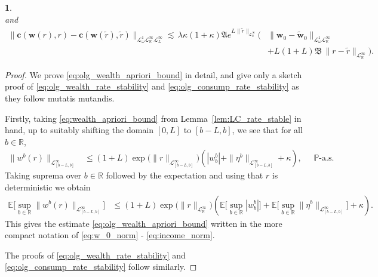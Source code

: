 \documentclass[11pt,oneside,english,reqno,dvipsnames,table]{amsart}
\numberwithin{equation}{section}
\theoremstyle{plain}
\theoremstyle{definition}
\theoremstyle{remark}
\theoremstyle{plain}
\newtheorem{lem}[thm]{\protect\lemmaname}
\theoremstyle{plain}
\theoremstyle{plain}
\theoremstyle{plain}
\theoremstyle{plain}
\theoremstyle{plain}
\theoremstyle{plain}
\providecommand{\lemmaname}{Lemma}
\newcommand{\red}[1]{#1}
\newcommand{\bc}{\mathbf{c}}
\newcommand{\bw}{\mathbf{w}}
\newcommand{\mbE}{\mathbb{E}}
\newcommand{\mbP}{\mathbb{P}}
\newcommand{\mbR}{\mathbb{R}}
\newcommand{\mfA}{\mathfrak{A}}
\newcommand{\mfB}{\mathfrak{B}}
\newcommand{\msL}{\mathscr{L}}
\numberwithin{thm}{section}
\begin{document}
\begin{lem}
\begin{equation}
	 \end{equation}
	 and
	 \begin{equation}\label{eq:olg_consump_rate_stability}	 
\begin{aligned}
	 	\|\bc(\bw(r),r)-\bc(\bw(\tilde{r}),\tilde{r})\|_{\msL^1_\omega \msL^\infty_{\mbR} \msL^\infty_{L}} \lesssim \,\lambda \kappa (1+\kappa) \mfA e^{L\|\tilde{r}\|_{\msL^\infty_\mbR}}  \bigg( &\|\bw_0-\tilde{\bw}_0\|_{\msL^1_\omega\msL^\infty_\mbR }\\
	 	&+ L (1+L)\mfB  \,\|r-\tilde{r}\|_{\msL^\infty_\mbR}\bigg).
	 	\end{aligned}
	 \end{equation}
\end{lem}
%
\begin{proof}
%
We prove \eqref{eq:olg_wealth_apriori_bound} in detail, and give only a sketch proof of \eqref{eq:olg_wealth_rate_stability} and \eqref{eq:olg_consump_rate_stability} as they follow mutatis mutandis.

Firstly, taking \eqref{eq:wealth_apriori_bound} from Lemma~\ref{lem:LC_rate_stable} in hand, up to suitably shifting the domain $[0,L]$ to $[b-L,b]$, we see that for all  $b\in \mbR$,
%
\begin{equation*}
	\begin{aligned}
		\|w^b(r)\|_{\msL^\infty_{[b-L,b]}} &\leq  (1+L)\exp\Big(\|r\|_{\msL^\infty_{[b-L,b]}}\Big) \left(|w^b_b| +  \|\eta^b\|_{\msL^\infty_{[b-L,b]}}+ \kappa \right),
	\end{aligned}
	\quad \mbP\text{-a.s.}
\end{equation*}
%
Taking suprema over $b\in \mbR$ followed by the expectation and using that $r$ is deterministic we obtain
%
\begin{equation*}
	\begin{aligned}
		\mbE\Big[\sup_{b\in \mbR}\|w^b(r)\|_{\msL^\infty_{[b-L,b]}} \Big]&\leq  (1+L)\exp\big(\|r\|_{\msL^\infty_\mbR}\big) \left(\mbE\Big[\sup_{b\in \mbR}|w^b_b| \Big] +  \mbE\Big[\sup_{b\in \mbR}\|\eta^b\|_{\msL^\infty_{[b-L,b]}}\Big]+ \kappa \right).
	\end{aligned}
\end{equation*}
%
This gives the estimate \eqref{eq:olg_wealth_apriori_bound} written in the more compact notation of \eqref{eq:w_0_norm} - \eqref{eq:income_norm}.

The proofs of \eqref{eq:olg_wealth_rate_stability} and \eqref{eq:olg_consump_rate_stability} follow similarly.
%
\end{proof}
\end{document}

